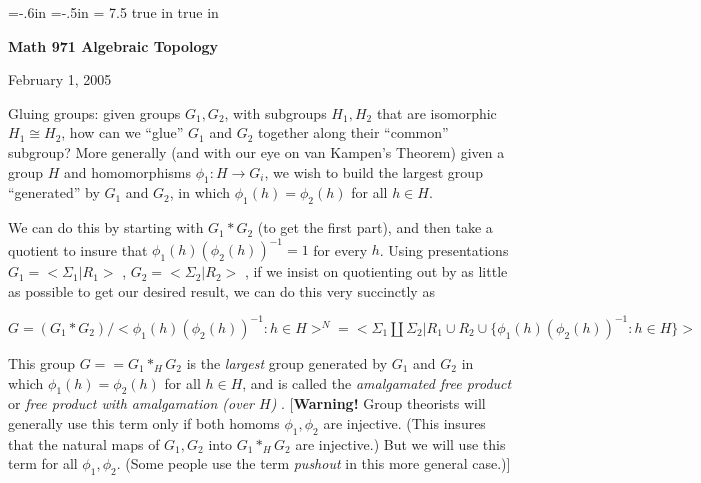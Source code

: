 

\overfullrule=0pt
\parindent=0pt

\nopagenumbers



\voffset=-.6in
\hoffset=-.5in
\hsize = 7.5 true in
 true in




\loadmsbm



\def\ctln{\centerline}
\def\u{\underbar}
\def\ssk{\smallskip}
\def\msk{\medskip}
\def\bsk{\bigskip}
\def\hsk{\hskip.1in}
\def\hhsk{\hskip.2in}
\def\dsl{\displaystyle}
\def\hskp{\hskip1.5in}

\def\lra{$\Leftrightarrow$ }
\def\ra{\rightarrow}
\def\mpto{\logmapsto}
\def\pu{\pi_1}
\def\mpu{$\pi_1$}
\def\sig{\Sigma}
\def\msig{$\Sigma$}
\def\ep{\epsilon}
\def\sset{\subseteq}
\def\del{\partial}




\ctln{\bf Math 971 Algebraic Topology}

\ssk

\ctln{February 1, 2005}

\msk


Gluing groups: given groups $G_1,G_2$, with subgroups 
$H_1,H_2$ that are
isomorphic $H_1\cong H_2$, how can we ``glue'' 
$G_1$ and $G_2$ together along their
``common'' subgroup? More generally (and with 
our eye on van Kampen's Theorem)
given a group $H$ and homomorphisms $\phi_1 : H\ra G_i$, 
we wish to build the largest group ``generated'' by
$G_1$ and $G_2$, in which $\phi_1(h)=\phi_2(h)$ for all $h\in H$. 

\msk

We can do this by starting
with $G_1*G_2$ (to get the first part), and then take 
a quotient to insure that 
$\phi_1(h)(\phi_2(h))^{-1} =1$ for every $h$. Using presentations 
$G_1=<\sig_1 | R_1>$ , $G_2=<\sig_2 | R_2>$ , if we 
insist on quotienting out by 
as little as possible to get our desired result, 
we can do this very succinctly as

\msk

\ctln{$G = (G_1*G_2)/<\phi_1(h)(\phi_2(h))^{-1} : h\in H>^N = 
<\sig_1\coprod\sig_2 | R_1\cup R_2\cup\{\phi_1(h)(\phi_2(h))^{-1} : h\in H\}>$}
 
\msk

This group $G= =G_1*_HG_2$ is the {\it largest} group generated by $G_1$ and $G_2$ in which 
$\phi_1(h)=\phi_2(h)$ for all $h\in H$, and is called the {\it amalgamated 
free product} or {\it free product with amalgamation (over $H$)} . [{\bf Warning!} 
Group theorists will generally use this term only if both homoms $\phi_1,\phi_2$
are injective. (This insures that the natural maps of $G_1,G_2$ into $G_1*_HG_2$
are injective.) But we will use this term for all $\phi_1,\phi_2$. (Some people use the term {\it pushout}
in this more general case.)]

